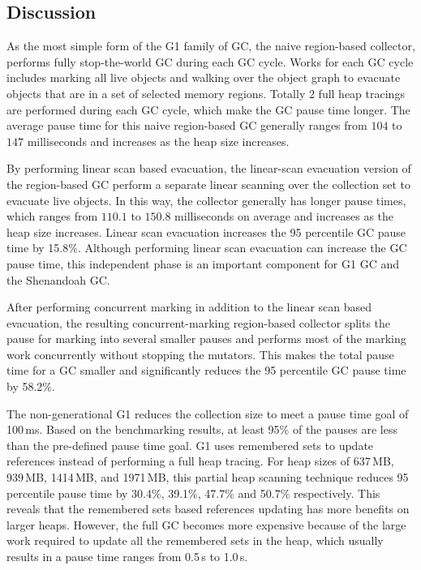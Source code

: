 \subsection{Discussion}

As the most simple form of the G1 family of GC, the naive region-based collector, performs fully
stop-the-world GC during each GC cycle. Works for each GC cycle includes marking all
live objects and walking over the object graph to evacuate objects that are in a set of selected memory
regions. Totally 2 full heap tracings are performed during each GC cycle, which make the GC
pause time longer. The average pause time for this naive region-based GC generally ranges from $104$ to $147$
milliseconds and increases as the heap size increases.

By performing linear scan based evacuation, the linear-scan evacuation version of the region-based
GC perform a separate linear scanning over the collection set
to evacuate live objects.
In this way, the collector generally has longer pause times,
which ranges from $110.1$ to $150.8$ milliseconds on average and increases as the heap size increases.
Linear scan evacuation increases the 95 percentile GC pause time by 15.8\%.
Although performing linear scan evacuation can increase the GC pause time,
this independent phase is an important component for G1 GC and the Shenandoah GC.

After performing concurrent marking in addition to the linear scan based evacuation,
the resulting concurrent-marking region-based collector splits the pause for marking into several smaller
pauses and performs most of the marking work concurrently without stopping the mutators.
This makes the total pause time for a GC smaller and significantly reduces the 95 percentile
GC pause time by 58.2\%.

The non-generational G1 reduces the collection size to meet a pause time goal of 100\,ms.
Based on the benchmarking results, at least 95\% of the pauses are less than the pre-defined
pause time goal. G1 uses remembered sets to update references
instead of performing a full heap tracing.
For heap sizes of 637\,MB, 939\,MB, 1414\,MB, and 1971\,MB, this
partial heap scanning technique reduces 95 percentile pause time by 30.4\%, 39.1\%, 47.7\% and 50.7\%
respectively. This reveals that the remembered sets based references updating has more benefits on
larger heaps. However, the full GC becomes more expensive because of the large work required
to update all the remembered sets in the heap, which usually results in a pause time
ranges from 0.5\,s to 1.0\,s.

